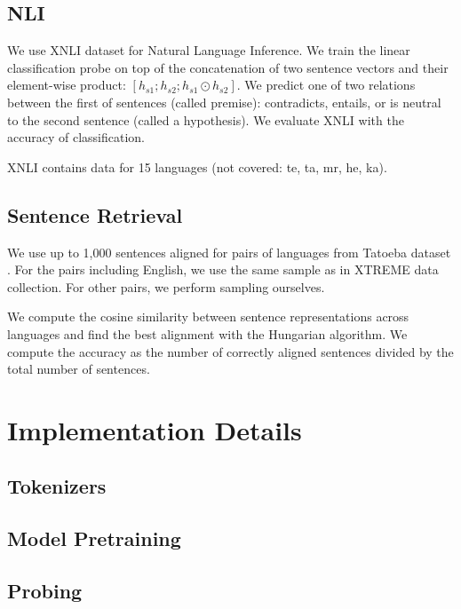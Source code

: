 \subsection{NLI}

We use XNLI dataset \cite{conneau_xnli_2018} for Natural Language Inference. We train the linear classification probe on top of the concatenation of two sentence vectors and their element-wise product: $[h_{s1}; h_{s2}; h_{s1} \odot h_{s2}]$. We predict one of two relations between the first of sentences (called premise): contradicts, entails, or is neutral to the second sentence (called a hypothesis). We evaluate XNLI with the accuracy of classification.

XNLI contains data for 15 languages (not covered: te, ta, mr, he, ka).

\subsection{Sentence Retrieval}
We use up to 1,000 sentences aligned for pairs of languages from Tatoeba dataset \cite{artetxe_massively_2019}. For the pairs including English, we use the same sample as in XTREME data collection. For other pairs, we perform sampling ourselves. 

We compute the cosine similarity between sentence representations across languages and find the best alignment with the Hungarian algorithm\cite{kuhn_hungarian_1955}. We compute the accuracy as the number of correctly aligned sentences divided by the total number of sentences.


\section{Implementation Details}

\subsection{Tokenizers}
\subsection{Model Pretraining}
\subsection{Probing}